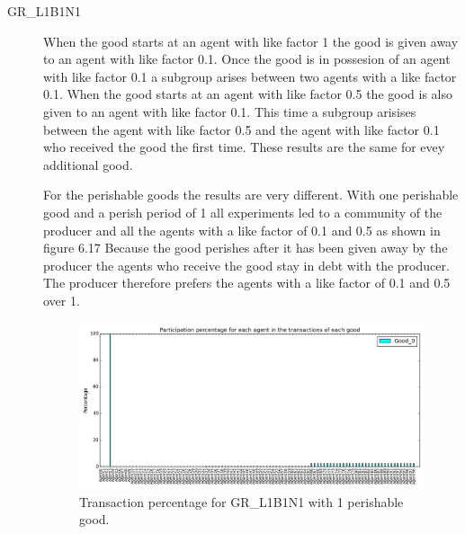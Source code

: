 \documentclass[twoside,openright]{uva-bachelor-thesis}
\begin{document}
\begin{description}
\item[GR\_L1B1N1] When the good starts at an agent with like factor 1 the good is given away to an agent with like factor 0.1. Once the good is in possesion of an agent with like factor 0.1 a subgroup arises between two agents with a like factor 0.1. When the good starts at an agent with like factor 0.5 the good is also given to an agent with like factor 0.1. This time a subgroup arisises between the agent with like factor 0.5 and the agent with like factor 0.1 who received the good the first time. These results are the same for evey additional good.

For the perishable goods the results are very different. With one perishable good and a perish period of 1 all experiments led to a community of the producer and all the agents with a like factor of 0.1 and 0.5 as shown in figure 6.17 Because the good perishes after it has been given away by the producer the agents who receive the good stay in debt with the producer. The producer therefore prefers the agents with a like factor of 0.1 and 0.5 over 1. \\
\begin{figure}[h!]
  \centering
   \includegraphics[scale=0.4]{Simulation_figures/GR_L1B1N1/1perishable_1-1_15k}
  \caption{Transaction percentage for GR\_L1B1N1 with 1 perishable good.}
\end{figure}


\end{description}
\end{document}
